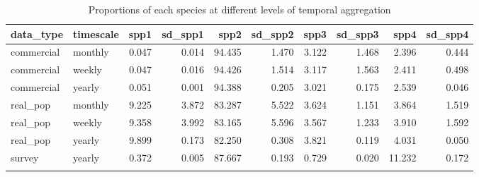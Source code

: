 \begin{longtable}{llrrrrrrrr}
\caption{Proportions of each species at different levels of temporal aggregation} \\ 
  \hline
data\_type & timescale & spp1 & sd\_spp1 & spp2 & sd\_spp2 & spp3 & sd\_spp3 & spp4 & sd\_spp4 \\ 
  \hline
commercial & monthly & 0.047 & 0.014 & 94.435 & 1.470 & 3.122 & 1.468 & 2.396 & 0.444 \\ 
  commercial & weekly & 0.047 & 0.016 & 94.426 & 1.514 & 3.117 & 1.563 & 2.411 & 0.498 \\ 
  commercial & yearly & 0.051 & 0.001 & 94.388 & 0.205 & 3.021 & 0.175 & 2.539 & 0.046 \\ 
  real\_pop & monthly & 9.225 & 3.872 & 83.287 & 5.522 & 3.624 & 1.151 & 3.864 & 1.519 \\ 
  real\_pop & weekly & 9.358 & 3.992 & 83.165 & 5.596 & 3.567 & 1.233 & 3.910 & 1.592 \\ 
  real\_pop & yearly & 9.899 & 0.173 & 82.250 & 0.308 & 3.821 & 0.119 & 4.031 & 0.050 \\ 
  survey & yearly & 0.372 & 0.005 & 87.667 & 0.193 & 0.729 & 0.020 & 11.232 & 0.172 \\ 
   \hline
\hline
\label{tab:7}
\end{longtable}
